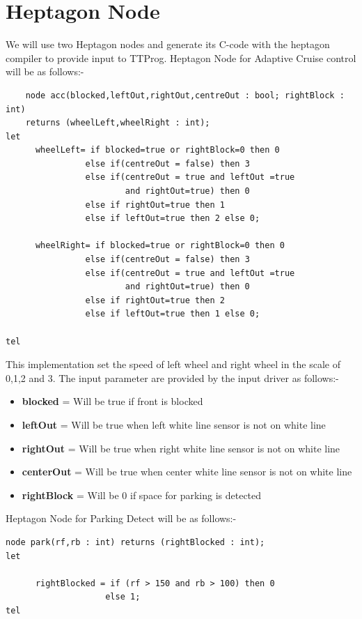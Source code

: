 \documentclass[16pt]{report}
\begin{document}
\section{Heptagon Node}
We will use two Heptagon nodes and generate its C-code with the heptagon compiler to provide input to TTProg. 
Heptagon Node for Adaptive Cruise control will be as follows:-
\begin{verbatim}
    node acc(blocked,leftOut,rightOut,centreOut : bool; rightBlock : int) 
    returns (wheelLeft,wheelRight : int);
let
      wheelLeft= if blocked=true or rightBlock=0 then 0
                else if(centreOut = false) then 3
                else if(centreOut = true and leftOut =true 
                        and rightOut=true) then 0
                else if rightOut=true then 1
                else if leftOut=true then 2 else 0;

      wheelRight= if blocked=true or rightBlock=0 then 0
                else if(centreOut = false) then 3
                else if(centreOut = true and leftOut =true 
                        and rightOut=true) then 0
                else if rightOut=true then 2
                else if leftOut=true then 1 else 0;

tel
\end{verbatim}
This implementation set the speed of left wheel and right wheel in the scale of 0,1,2 and 3. The input parameter are provided by the input driver as follows:-
\begin{itemize}
    \item \textbf{blocked} = Will be true if front is blocked
    \item \textbf{leftOut} = Will be true when left white line sensor is not on white line
    \item \textbf{rightOut} = Will be true when right white line sensor is not on white line
    \item \textbf{centerOut} = Will be true when center white line sensor is not on white line
    \item \textbf{rightBlock} = Will be 0 if space for parking is detected
\end{itemize}


\vspace{5mm}
\noindent
Heptagon Node for Parking Detect will be as follows:-
\begin{verbatim}
node park(rf,rb : int) returns (rightBlocked : int);
let

      rightBlocked = if (rf > 150 and rb > 100) then 0 
                    else 1;
tel
\end{verbatim}
\end{document}
